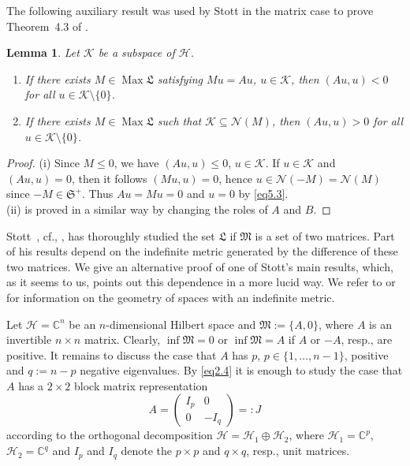 \documentclass[12pt, a4paper, reqno, twoside]{amsart}
\numberwithin{equation}{section}
\DeclareMathOperator{\Max}{Max}
\newcommand{\frakS}{\mathfrak S}
\newcommand{\frakL}{\mathfrak L}
\newcommand{\frakM}{\mathfrak M}
\newcommand{\cf}{\mbox{cf.}\xspace}
\newtheorem{lemma}[theorem]{Lemma}
\theoremstyle{definition}
\theoremstyle{remark}
\theoremstyle{mystyle}
\begin{document}
The following auxiliary result was used by Stott in the matrix case to
prove Theorem~4.3 of \cite{Stott2016arxiv}.

\begin{lemma}
\label{lem5.4}
Let $\mathscr K$ be a subspace of $\mathscr H$.
\begin{enumerate}
\item[(i)]
  If there exists $M\in\Max\frakL$ satisfying $Mu=Au$, $u\in\mathscr
  K$, then $(Au,u)<0$ for all $u\in\mathscr K\setminus\{0\}$.
\item[(ii)]
  If there exists $M\in\Max\frakL$ such that $\mathscr
  K\subseteq\mathscr N(M)$, then $(Au,u)>0$ for all  $u\in\mathscr
  K\setminus\{0\}$.
\end{enumerate}
\end{lemma}

\begin{proof}
(i) Since $M\leq0$, we have $(Au,u)\leq0$, $u\in\mathscr K$. If
$u\in\mathscr K$ and $(Au,u)=0$, then it follows $(Mu,u)=0$, hence
$u\in\mathscr N(-M)=\mathscr N(M)$ since $-M\in\frakS^{+}$. Thus
$Au=Mu=0$ and $u=0$ by \eqref{eq5.3}. \\
(ii) is proved in a similar way by changing the roles of $A$ and $B$.  
\end{proof}

Stott~\cite{Stott2017dis}, \cf \cite{GaubertStott2017},
\cite{Stott2016arxiv}, has thoroughly studied the set $\frakL$ if
$\frakM$ is a set of two matrices. Part of his results depend on the
indefinite metric generated by the difference of these two
matrices. We give an alternative proof of one of Stott's main results,
which, as it seems to us, points out this dependence in a more lucid
way. We refer to \cite{AzizovIokhvidov1989} or \cite{Bognar1974} for
information on the geometry of spaces with an indefinite metric.

Let $\mathscr H=\mathbb C^{n}$ be an $n$-dimensional Hilbert space and
$\frakM:=\{A,0\}$, where $A$ is an invertible $n\times n$
matrix. Clearly, $\inf\frakM=0$ or $\inf\frakM=A$ if $A$ or $-A$,
resp., are positive. It remains to discuss the case that $A$ has $p$,
$p\in\{1,\ldots,n-1\}$, positive and $q:=n-p$ negative eigenvalues. By
\eqref{eq2.4} it is enough to study the case that $A$ has a $2\times 2$
block matrix representation
\[
A= \begin{pmatrix}
    I_{p} & 0 \\ 0 & -I_{q}
    \end{pmatrix} =: J
\]
according to the orthogonal decomposition $\mathscr H=\mathscr
H_{1}\oplus\mathscr H_{2}$, where $\mathscr H_{1}=\mathbb C^{p}$,
$\mathscr H_{2}=\mathbb C^{q}$ and $I_{p}$ and $I_{q}$ denote the
$p\times p$ and $q\times q$, resp., unit matrices.
\end{document}

